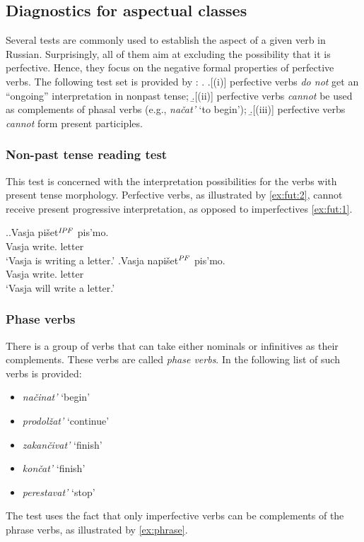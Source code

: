 \subsection{Diagnostics for aspectual classes}\label{sec:tests:old}
Several tests are commonly used to establish the aspect of a given verb in Russian. Surprisingly, all of them aim at excluding the possibility that it is perfective. Hence, they focus on the negative formal properties of perfective verbs. The following test set is provided by \citet{Schoorlemmer:95}: 
\ex.\label{tests} \a.[(i)] \label{sttest1} perfective verbs \textit{do not} get an ``ongoing'' interpretation in nonpast tense; 
\b.[(ii)] \label{sttest2} perfective verbs \textit{cannot} be used as complements of phasal verbs (e.g., \textit{na\v{c}at'} `to begin'); 
\b.[(iii)] \label{sttest3} perfective verbs \textit{cannot} form present participles.

\subsubsection{Non-past tense reading test}
This test is concerned with the interpretation possibilities for the verbs with present tense morphology. Perfective verbs, as illustrated by \ref{ex:fut:2}, cannot receive present progressive interpretation, as opposed to imperfectives \ref{ex:fut:1}.

\ex.\label{ex:fut}\ag.\label{ex:fut:1}Vasja pi\v{s}et$^{\mathit{IPF}}$ pis'mo.\\
Vasja write. letter\\
`Vasja is writing a letter.'
\bg.\label{ex:fut:2}Vasja napi\v{s}et$^{\mathit{PF}}$ pis'mo.\\
Vasja write. letter\\
`Vasja will write a letter.'
 
\subsubsection{Phase verbs}
There is a group of verbs that can take either nominals or infinitives as their complements. These verbs are called \textit{phase verbs}. In \cite{Borik:02} the following list of such verbs is provided:
\begin{itemize}[noitemsep]
\item \textit{na\v{c}inat'} `begin'
\item \textit{prodol\v{z}at'} `continue'
\item \textit{zakan\v{c}ivat'} `finish'
\item \textit{kon\v{c}at'} `finish'
\item \textit{perestavat'} `stop'
\end{itemize}
The test uses the fact that only imperfective verbs can be complements of the phrase verbs, as illustrated by \ref{ex:phrase}.

